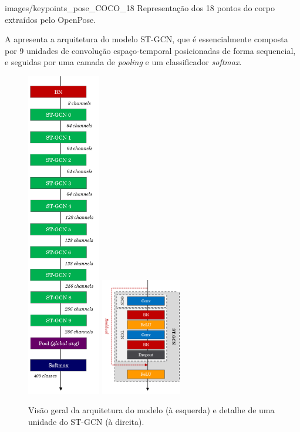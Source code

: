     {images/keypoints_pose_COCO_18}
    {Representação dos 18 pontos do corpo extraídos pelo OpenPose.}

A  apresenta a arquitetura do modelo ST-GCN, que é essencialmente composta por 9 unidades de convolução espaço-temporal posicionadas de forma sequencial, e seguidas por uma camada de \textit{pooling} e um classificador \textit{softmax}.

\begin{figure}[ht]
    \centering
    \includegraphics[width=3.2cm]{images/st_gcn_architecture}
    \includegraphics[width=3.5cm]{images/st_gcn_architeture_unit}
    \caption{Visão geral da arquitetura do modelo (à esquerda) e detalhe de uma unidade do ST-GCN (à direita).}
    \label{fig:st-gcn-architecture}
\end{figure}


